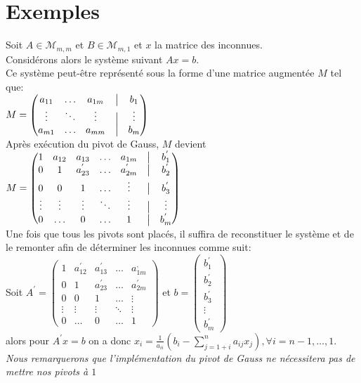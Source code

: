 \section{Exemples}
Soit $A \in \mathcal{M}_{m,m}$ et $B \in \mathcal{M}_{m,1}$ et $x$ la matrice des inconnues. \\
Considérons alors le système suivant $Ax=b$.\\
Ce système peut-être représenté sous la forme d'une matrice augmentée $M$ tel que: \vspace{10pt}\\
$
M =  \begin{pmatrix}
a_{11}& \ldots & a_{1m} &\bigm| & b_{1} \\
\vdots & \ddots & \vdots&\bigm| &  \vdots \\
a_{m1} & \ldots & a_{mm} &\bigm|& b_{m} 
\end{pmatrix}
$
\vspace{10pt}\\
Après exécution du pivot de Gauss, $M$ devient \vspace{10pt}\\
$
M =  \begin{pmatrix}
1& a_{12}& a_{13} &\ldots & a_{1m} &\bigm| & b_{1}^{'} \\
0 & 1 & a_{23}^{'}&  \ldots &a_{2m}^{'} &\bigm| & b_{2}^{'} \\
0 & 0 & 1 & \ldots &\vdots &\bigm| & b_{3}^{'} \\
\vdots & \vdots & \vdots& \ddots& \vdots &\bigm| &  \vdots \\
0 & \ldots &0 &\ldots &1&\bigm|& b_{m}^{'}
\end{pmatrix}
$  \vspace{10pt}\\
Une fois que tous les pivots sont placés, il suffira de reconstituer le système et de le remonter afin de déterminer les inconnues comme suit:\vspace{10pt}\\
Soit $A^{'}=  \begin{pmatrix}
1& a_{12}^{'}& a_{13}^{'} &\ldots & a_{1m}^{,} \\
0 & 1 & a_{23}^{'}&  \ldots &a_{2m}^{'} \\
0 & 0 & 1 & \ldots &\vdots\\
\vdots & \vdots & \vdots& \ddots& \vdots \\
0 & \ldots &0 &\ldots &1
\end{pmatrix}
$
et $b = \begin{pmatrix}
b_{1}^{'} \\
b_{2}^{'} \\
b_{3}^{'} \\
\vdots \\
 b_{m}^{'}
\end{pmatrix}
$ \\
alors pour $A^{'}x = b$ on a donc $x_i = \frac{1}{a_{ii}}\left( b_i-\sum\limits_{j=1+i}^n a_{ij}x_j \right), \forall i = n-1, \ldots, 1$. \\
\textit{Nous remarquerons que l'implémentation du pivot de Gauss ne nécessitera pas de mettre nos pivots à $1$}

